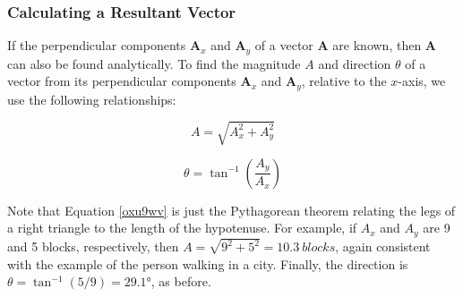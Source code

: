\documentclass[../../main-ap-physics.tex]{subfiles}
\begin{document}
\subsubsection*{Calculating a Resultant Vector}

If the perpendicular components  $\textbf{A}_x$ and $\textbf{A}_y$ of a vector \textbf{A} are known, then \textbf{A} can also be found analytically. To find the magnitude $A$ and direction $\theta$ of a vector from its perpendicular components  $\textbf{A}_x$ and $\textbf{A}_y$, relative to the $x$-axis, we use the following relationships:

\begin{equation} \label{oxu9wv}
    A = \sqrt{A_x^2 + A_y^2}
\end{equation}

\begin{equation}
    \theta = \tan^{-1}\left(\frac{A_y}{A_x}\right)
\end{equation}

\begin{center}
    \captionsetup{type=figure,margin=1in,font=scriptsize}
    \label{IHuUz3}
 \end{center}

 Note that Equation \eqref{oxu9wv} is just the Pythagorean theorem relating the legs of a right triangle to the length of the hypotenuse. For example, if $A_x$ and $A_y$ are 9 and 5 blocks, respectively, then  $A = \sqrt{9^2 + 5^2} = \SI{10.3}{blocks}$, again consistent with the example of the person walking in a city. Finally, the direction is $\theta=\tan^{-1}(5/9) = \ang{29.1}$, as before.
\end{document}
